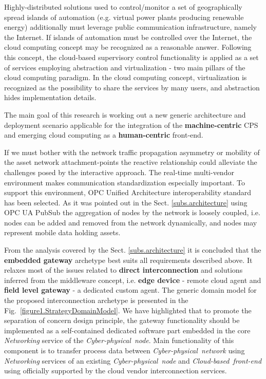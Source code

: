 \documentclass{article}
\begin{document}
Highly-distributed solutions used to control/monitor a set of geographically spread islands of automation (e.g. virtual power plants producing renewable energy) additionally must leverage public communication infrastructure, namely the Internet. If islands of automation must be controlled over the Internet, the cloud computing concept may be recognized as a reasonable answer. Following this concept, the cloud-based supervisory control functionality is applied as a set of services employing abstraction and virtualization - two main pillars of the cloud computing paradigm. In the cloud computing concept, virtualization is recognized as the possibility to share the services by many users, and abstraction hides implementation details.

The main goal of this research is working out a new generic architecture and deployment scenario applicable for the integration of the \textbf{machine-centric} CPS and emerging cloud computing as a \textbf{human-centric} front-end.

If we must bother with the network traffic propagation asymmetry or mobility of the asset network attachment-points the reactive relationship\cite{mpostol2020} could alleviate the challenges posed by the interactive approach. The real-time multi-vendor environment makes communication standardization especially important. To support this environment, OPC Unified Architecture \cite{RefWorks:doc:5ac86c98e4b009947bbb874c} interoperability standard has been selected. As it was pointed out in the Sect. \ref*{subs.architecture} using OPC UA PubSub \cite{RefWorks:doc:5d98837de4b055984c0eecf0} the aggregation of nodes by the network is loosely coupled, i.e. nodes can be added and removed from the network dynamically, and nodes may represent mobile data holding assets.

From the analysis covered by the Sect. \ref*{subs.architecture} it is concluded that the \textbf{embedded gateway} archetype best suits all requirements described above. It relaxes most of the issues related to \textbf{direct interconnection} and solutions inferred from the middleware concept, i.e. \textbf{edge device} - remote cloud agent and \textbf{field level gateway} - a dedicated custom agent. The generic domain model for the proposed interconnection archetype is presented in the Fig.~\ref*{figure1.StrategyDomainModel}. We have highlighted that to promote the separation of concern design principle, the gateway functionality should be implemented as a self-contained dedicated software part embedded in the core \textit{Networking} service of the \textit{Cyber-physical\ node}. Main functionality of this component is to transfer process data between \textit{Cyber-physical\ network} using \textit{Networking} services of an existing \textit{Cyber-physical\ node} and \textit{Cloud-based\ front-end} using officially supported by the cloud vendor interconnection services.
\end{document}

